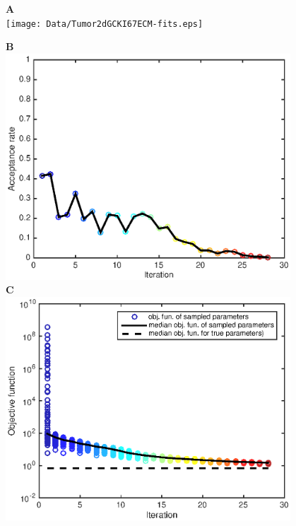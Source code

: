\documentclass[10pt,letterpaper]{article}
\begin{document}
\begin{figure}[p]
\begin{adjustwidth}{-2in}{0in} %
\begin{center}
\textbf{A} \\ \texttt{[image: Data/Tumor2dGCKI67ECM-fits.eps]} \\
\begin{minipage}[t]{0.45\textwidth}
	\textbf{B} \\ \includegraphics[width=0.95\textwidth]{Data/Tumor2dGCKI67ECM-acceptanceRate.eps}\\
	\textbf{C} \\ \includegraphics[width=0.95\textwidth]{Data/Tumor2dGCKI67ECM-objFunc.eps}

\end{minipage}
\end{center}
\end{adjustwidth}
\end{figure}
\end{document}
